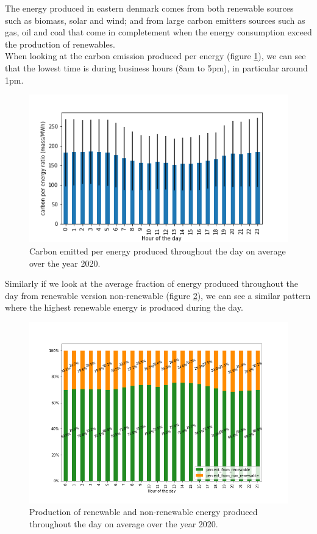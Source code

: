 \documentclass[11pt]{article} %
\begin{document}
The energy produced in eastern denmark comes from both renewable sources such as biomass, solar and wind; and from large carbon emitters sources such as gas, oil and coal that come in completement when the energy consumption exceed the production of renewables.\\
When looking at the carbon emission produced per energy (figure \ref{fig:co2_kwh}), we can see that the lowest time is during business hours (8am to 5pm), in particular around 1pm. \\

\begin{figure}
  \includegraphics[width=0.8\linewidth]{../outputs/carbon_per_energy_ratio.png}
  \caption{Carbon emitted per energy produced throughout the day on average over the year 2020.}
  \label{fig:co2_kwh}
\end{figure}
 
Similarly if we look at the average fraction of energy produced throughout the day from renewable version non-renewable (figure \ref{fig:per_green}), we can see a similar pattern where the highest renewable energy is produced during the day. 

\begin{figure}
  \includegraphics[width=1\linewidth]{../outputs/generated_energy_green_percent.png}
  \caption{Production of renewable and non-renewable energy produced throughout the day on average over the year 2020.}
  \label{fig:per_green}
\end{figure}
\end{document}
